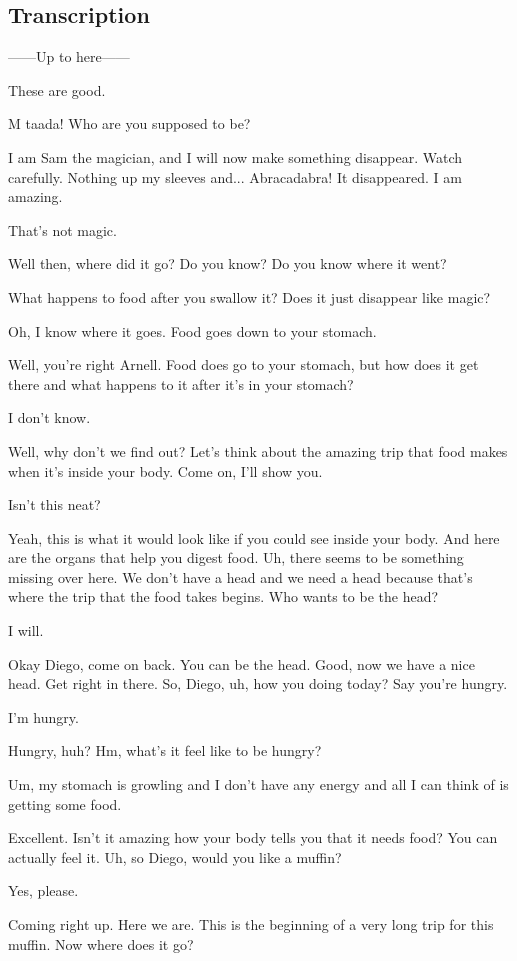 \subsection{Transcription}

------Up to here------

These are good.

M taada! Who are you supposed to be?

I am Sam the magician, and I will now make something disappear. Watch carefully. Nothing up my sleeves and... Abracadabra! It disappeared. I am amazing.

That's not magic.

Well then, where did it go? Do you know? Do you know where it went?

What happens to food after you swallow it? Does it just disappear like magic?

Oh, I know where it goes. Food goes down to your stomach.

Well, you're right Arnell. Food does go to your stomach, but how does it get there and what happens to it after it's in your stomach?

I don't know.

Well, why don't we find out? Let's think about the amazing trip that food makes when it's inside your body. Come on, I'll show you.

Isn't this neat?

Yeah, this is what it would look like if you could see inside your body. And here are the organs that help you digest food. Uh, there seems to be something missing over here. We don't have a head and we need a head because that's where the trip that the food takes begins. Who wants to be the head?

I will.

Okay Diego, come on back. You can be the head. Good, now we have a nice head. Get right in there. So, Diego, uh, how you doing today? Say you're hungry.

I'm hungry.

Hungry, huh? Hm, what's it feel like to be hungry?

Um, my stomach is growling and I don't have any energy and all I can think of is getting some food.

Excellent. Isn't it amazing how your body tells you that it needs food? You can actually feel it. Uh, so Diego, would you like a muffin?

Yes, please.

Coming right up. Here we are. This is the beginning of a very long trip for this muffin. Now where does it go?

